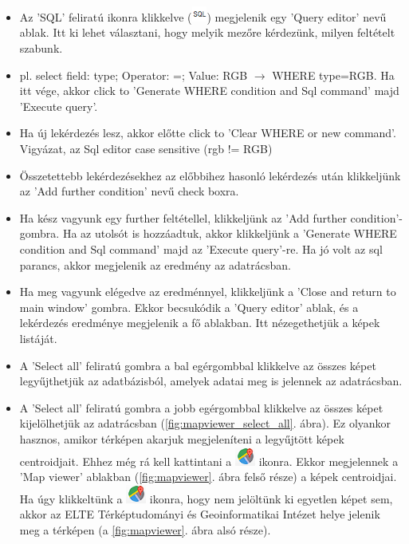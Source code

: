 \documentclass[a4paper,12pt]{article}
\begin{document}
\begin{itemize}
	\item  Az 'SQL' feliratú ikonra klikkelve (\includegraphics[width=0.5cm]{sql.png}) megjelenik egy 'Query editor' nevű ablak. Itt ki lehet választani, hogy melyik mezőre kérdezünk, milyen feltételt szabunk.
	
	\item pl. select field: type;  Operator: =; Value: RGB $\rightarrow$ 
	WHERE type=RGB. Ha itt vége, akkor click to 'Generate WHERE condition and Sql command' majd 'Execute query'. 
	
	\item Ha új lekérdezés lesz, akkor előtte click to 'Clear WHERE or new command'. Vigyázat, az Sql editor case sensitive (rgb !=  RGB)
	
	\item Összetettebb lekérdezésekhez az előbbihez hasonló lekérdezés után klikkeljünk az 'Add further condition' nevű check boxra. 
	
	\item Ha kész vagyunk egy further feltétellel, klikkeljünk az 'Add further condition'- gombra. Ha az utolsót is hozzáadtuk, akkor klikkeljünk a 'Generate WHERE condition and Sql command' majd az 'Execute query'-re. Ha jó volt az sql parancs, akkor megjelenik az eredmény az adatrácsban.
	
	\item Ha meg vagyunk elégedve az eredménnyel, klikkeljünk a 'Close and return to main window' gombra. Ekkor becsukódik a 'Query editor' ablak, és a lekérdezés eredménye megjelenik a fő ablakban. Itt nézegethetjük a képek listáját.
	
	\item A 'Select all' feliratú gombra a bal egérgombbal klikkelve az összes képet legyűjthetjük az adatbázisból, amelyek adatai meg is jelennek az adatrácsban.
	
	\item A 'Select all' feliratú gombra a jobb egérgombbal klikkelve az összes képet kijelölhetjük az  adatrácsban (\ref{fig:mapviewer_select_all}. ábra). Ez olyankor hasznos, amikor térképen akarjuk megjeleníteni a legyűjtött képek centroidjait. Ehhez még rá kell kattintani a \includegraphics[width = 0.5 cm]{mapviewer_ikon.png} ikonra. Ekkor megjelennek a 'Map viewer' ablakban (\ref{fig:mapviewer}. ábra felső része) a képek centroidjai. Ha úgy klikkeltünk a \includegraphics[width = 0.5 cm]{mapviewer_ikon.png} ikonra, hogy nem jelöltünk ki egyetlen képet sem, akkor az ELTE Térképtudományi és Geoinformatikai Intézet helye jelenik meg a térképen (a \ref{fig:mapviewer}. ábra alsó része).
	

\end{itemize}
\end{document}
